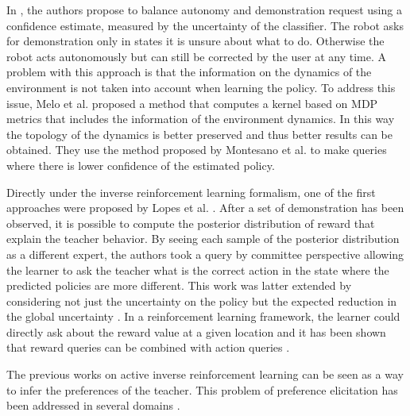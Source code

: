 In \cite{chernova09jair}, the authors propose to balance autonomy and demonstration request using a confidence estimate, measured by the uncertainty of the classifier. The robot asks for demonstration only in states it is unsure about what to do. Otherwise the robot acts autonomously but can still be corrected by the user at any time. A problem with this approach is that the information on the dynamics of the environment is not taken into account when learning the policy. To address this issue, Melo et al. \cite{melo2010learning} proposed a method that computes a kernel based on MDP metrics \cite{taylor2009bounding} that includes the information of the environment dynamics. In this way the topology of the dynamics is better preserved and thus better results can be obtained. They use the method proposed by Montesano et al. \cite{montesano2012active} to make queries where there is lower confidence of the estimated policy.

Directly under the inverse reinforcement learning formalism, one of the first approaches were proposed by Lopes et al. \cite{macl09airl}. After a set of demonstration has been observed, it is possible to compute the posterior distribution of reward that explain the teacher behavior. By seeing each sample of the posterior distribution as a different expert, the authors took a query by committee perspective allowing the learner to ask the teacher what is the correct action in the state where the predicted policies are more different. This work was latter extended by considering not just the uncertainty on the policy but the expected reduction in the global uncertainty \cite{cohn2010selecting,cohn2011comparing}. In a reinforcement learning framework, the learner could directly ask about the reward value at a given location \cite{regan2011eliciting} and it has been shown that reward queries can be combined with action queries \cite{melo2013multi}.

The previous works on active inverse reinforcement learning can be seen as a way to infer the preferences of the teacher. This problem of preference elicitation has been addressed in several domains \cite{furnkranz2010preference,chajewska2000making,braziunas2012local,viappiani2010optimal,brochu2010tutorial}.



